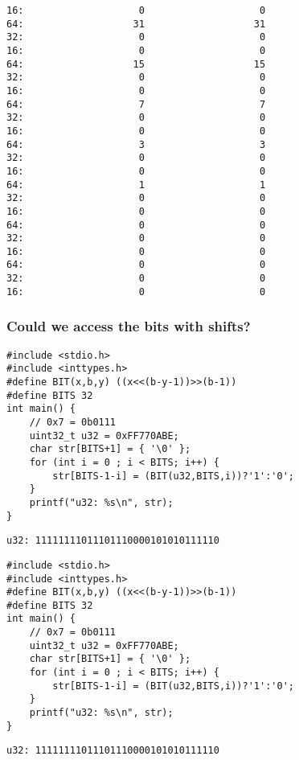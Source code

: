 \documentclass[11pt]{article}
\begin{document}
\begin{verbatim}
16:                    0                    0
64:                   31                   31
32:                    0                    0
16:                    0                    0
64:                   15                   15
32:                    0                    0
16:                    0                    0
64:                    7                    7
32:                    0                    0
16:                    0                    0
64:                    3                    3
32:                    0                    0
16:                    0                    0
64:                    1                    1
32:                    0                    0
16:                    0                    0
64:                    0                    0
32:                    0                    0
16:                    0                    0
64:                    0                    0
32:                    0                    0
16:                    0                    0
\end{verbatim}

\subsubsection{Could we access the bits with shifts?}
\label{sec:org1ce1b77}

\begin{verbatim}
#include <stdio.h>
#include <inttypes.h>
#define BIT(x,b,y) ((x<<(b-y-1))>>(b-1))
#define BITS 32
int main() {
    // 0x7 = 0b0111
    uint32_t u32 = 0xFF770ABE;
    char str[BITS+1] = { '\0' };
    for (int i = 0 ; i < BITS; i++) {
        str[BITS-1-i] = (BIT(u32,BITS,i))?'1':'0';
    }
    printf("u32: %s\n", str);
}
\end{verbatim}

\begin{verbatim}
u32: 11111111011101110000101010111110
\end{verbatim}


\begin{verbatim}
#include <stdio.h>
#include <inttypes.h>
#define BIT(x,b,y) ((x<<(b-y-1))>>(b-1))
#define BITS 32
int main() {
    // 0x7 = 0b0111
    uint32_t u32 = 0xFF770ABE;
    char str[BITS+1] = { '\0' };
    for (int i = 0 ; i < BITS; i++) {
        str[BITS-1-i] = (BIT(u32,BITS,i))?'1':'0';
    }
    printf("u32: %s\n", str);
}
\end{verbatim}

\begin{verbatim}
u32: 11111111011101110000101010111110
\end{verbatim}
\end{document}
